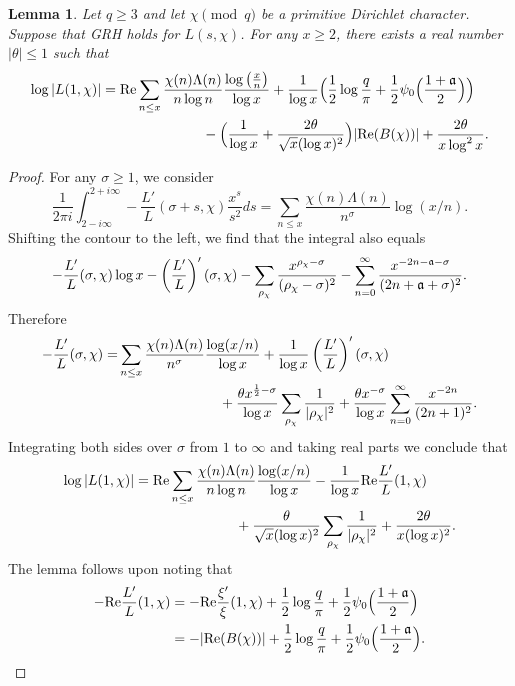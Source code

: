 \documentclass [12pt]{amsart}
\newtheorem{lemma}{Lemma}[section]
\numberwithin{equation}{section}
\newcommand{\tRe}{\textup{Re}}
\begin{document}
\begin{lemma}\label{propL1}   Let $q\ge 3$ and let $\chi \pmod q$
be a primitive Dirichlet character.  
 Suppose that GRH holds for $L(s,\chi)$. For any $x\geq 2$, there exists a real number $|\theta|\leq 1$ such that
\begin{align*}
\log|L(1,\chi)|&= \tRe\sum_{n\leq x}\frac{\chi(n)\Lambda(n)}{n\log n}
\frac{\log\left(\frac{x}{n}\right)}{\log x} +\frac{1}{\log x} \Big(\frac 12 \log \frac{q}{\pi} + 
\frac 12 \psi_0\Big(\frac{1+\frak a}{2}\Big)\Big) 
\\
&\hskip 1 in - \Big( \frac 1{\log x} + \frac{2\theta}{\sqrt{x}(\log x)^2}\Big)  |\tRe (B(\chi))| +\frac{2\theta}{x\log^2 x}.
\end{align*}
\end{lemma}
\begin{proof}  For any $\sigma \ge 1$, we consider 
$$
 \frac{1}{2\pi i}\int_{2-i\infty}^{2+i\infty}
-\frac{L'}{L}(\sigma+s,\chi)\frac{x^{s}}{s^2}ds=
\sum_{n\leq x}\frac{\chi(n)\Lambda(n)}{n^{\sigma}}\log(x/n).
$$
Shifting the contour to the left, we find that the integral also equals
$$
-\frac{L'}{L}(\sigma,\chi)\log x-\left(\frac{L'}{L}\right)'(\sigma,\chi)
-\sum_{\rho_\chi}\frac{x^{\rho_\chi-\sigma}}{(\rho_\chi-\sigma)^2}-
 \sum_{n=0}^{\infty}\frac{x^{-2n-{\frak a}-\sigma}}{(2n+\frak a+ \sigma)^2}.
$$
Therefore 
\begin{align*}
-\frac{L'}{L}(\sigma,\chi)= &\sum_{n\leq x}\frac{\chi(n)\Lambda(n)}{n^{\sigma}}
\frac{\log(x/n)}{\log x}+ \frac{1}{\log x}\left(\frac{L'}{L}\right)'(\sigma,\chi)\\
&\hskip 1 in +\frac{\theta x^{\frac 12-\sigma}}{\log x}\sum_{\rho_\chi} \frac{1}{|\rho_\chi|^2} 
+
\frac{\theta x^{-\sigma}}{\log x}\sum_{n=0}^{\infty}\frac{x^{-2n}}{(2n+1)^2}.
\end{align*}
Integrating both sides over $\sigma$ from $1$ to $\infty$ and taking real parts 
we conclude that 
\begin{align*}
\log |L(1,\chi)|&= \tRe\sum_{n\leq x}\frac{\chi(n)\Lambda(n)}{n\log n} 
\frac{\log(x/n)}{\log x}- \frac{1}{\log x}\tRe\frac{L'}{L}(1,\chi)\\
&\hskip 1 in + \frac{\theta}{\sqrt{x}(\log x)^2}
 \sum_{\rho_\chi}\frac{1}{|\rho_\chi|^2} + \frac{2\theta}{x (\log x)^2}.
 \end{align*}
The lemma follows upon noting that 
\begin{align*}
-\tRe \frac{L^{\prime}}{L}(1,\chi) 
&= -\tRe \frac{\xi^{\prime}}{\xi}(1,\chi) + \frac 12\log \frac{q}{\pi} +\frac 12\psi_0\Big(\frac{1+{\frak a}}{2}\Big) 
\\
&= - |\tRe (B(\chi))| + \frac 12 \log \frac{q}{\pi} + \frac 12 
\psi_0 \Big(\frac{1+\frak a}{2}\Big). 
\end{align*}
\end{proof}
\end{document}
